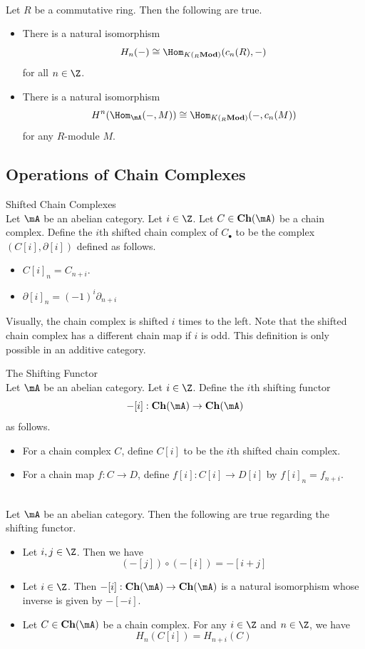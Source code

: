 \documentclass[a4paper]{article}
\begin{document}
\begin{prp}{}{}\\
Let $R$ be a commutative ring. Then the following are true. 
\begin{itemize}
\item There is a natural isomorphism $$H_n(-)\cong\Hom_{K({_R}\bold{Mod})}(c_n(R),-)$$ for all $n\in\Z$. 
\item There is a natural isomorphism $$H^n(\Hom_\mA(-,M))\cong\Hom_{K({_R}\bold{Mod})}(-,c_n(M))$$ for any $R$-module $M$. 
\end{itemize}
\end{prp}

\subsection{Operations of Chain Complexes}
\begin{defn}{Shifted Chain Complexes}{}\\
Let $\mA$ be an abelian category. Let $i\in\Z$. Let $C\in\bold{Ch}(\mA)$ be a chain complex. Define the $i$th shifted chain complex of $C_\bullet$ to be the complex $(C[i],\partial[i])$ defined as follows. 
\begin{itemize}
\item $C[i]_n=C_{n+i}$. 
\item $\partial[i]_n=(-1)^i\partial_{n+i}$
\end{itemize}
\end{defn}

Visually, the chain complex is shifted $i$ times to the left. Note that the shifted chain complex has a different chain map if $i$ is odd. This definition is only possible in an additive category. 

\begin{defn}{The Shifting Functor}{}\\
Let $\mA$ be an abelian category. Let $i\in\Z$. Define the $i$th shifting functor $$-[i]:\bold{Ch}(\mA)\to\bold{Ch}(\mA)$$ as follows. 
\begin{itemize}
\item For a chain complex $C$, define $C[i]$ to be the $i$th shifted chain complex. 
\item For a chain map $f:C\to D$, define $f[i]:C[i]\to D[i]$ by $f[i]_n=f_{n+i}$. 
\end{itemize}
\end{defn}

\begin{lmm}{}{}\\
Let $\mA$ be an abelian category. Then the following are true regarding the shifting functor. 
\begin{itemize}
\item Let $i,j\in\Z$. Then we have $$(-[j])\circ(-[i])=-[i+j]$$
\item Let $i\in\Z$. Then $-[i]:\bold{Ch}(\mA)\to\bold{Ch}(\mA)$ is a natural isomorphism whose inverse is given by $-[-i]$. 
\item Let $C\in\bold{Ch}(\mA)$ be a chain complex. For any $i\in\Z$ and $n\in\Z$, we have $$H_n(C[i])=H_{n+i}(C)$$
\end{itemize}
\end{lmm}
\end{document}
